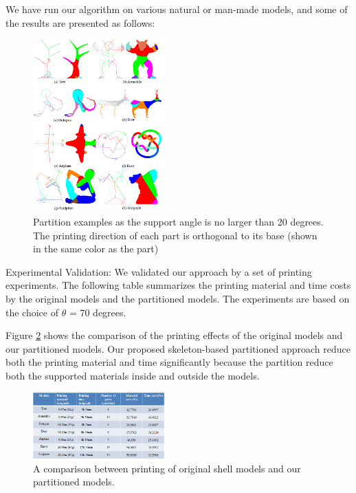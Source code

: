 We have run our algorithm on various natural or man-made models, and some of the results are presented as follows:

\begin{figure}[tbp]
  \centering
  \includegraphics[width=0.45\textwidth]{figs/programming.png}
  \caption{\label{fig:programming}%
           Partition examples as the support angle is no larger than 20 degrees. The printing direction of each part is orthogonal to its base (shown in the same color as the part)}
\end{figure}

Experimental Validation: We validated our approach by a set of printing experiments. The following table summarizes the printing material and time costs by the original models and the partitioned models. The experiments are based on the choice of $\theta$ = 70 degrees.


Figure \ref{fig:comparison} shows the comparison of the printing effects of the original models and our partitioned models. Our proposed skeleton-based partitioned approach reduce both the printing material and time significantly because the partition reduce both the supported materials inside and outside the models.

\begin{figure}[tbp]
  \centering
  \includegraphics[width=0.45\textwidth]{figs/comparison.png}
  \caption{\label{fig:comparison}%
           A comparison between printing of original shell models and our partitioned models.}
\end{figure}


